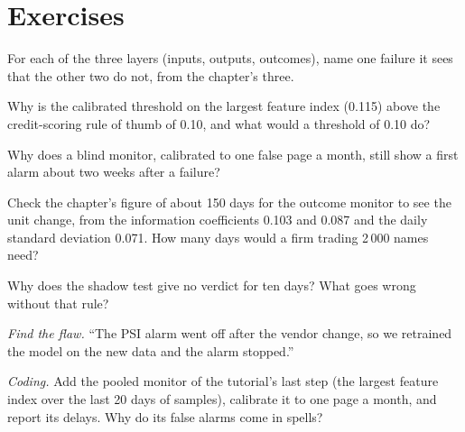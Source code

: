 \section{Exercises}

\begin{exercise}[$\star$]\label{exo:ml:monitoring-and-retraining:1}
For each of the three layers (inputs, outputs, outcomes), name one failure it sees that the other two do not, from the chapter's
three.
\end{exercise}

\begin{exercise}[$\star$]\label{exo:ml:monitoring-and-retraining:2}
Why is the calibrated threshold on the largest feature index (0.115) above the credit-scoring rule of thumb of 0.10, and what
would a threshold of 0.10 do?
\end{exercise}

\begin{exercise}[$\star$]\label{exo:ml:monitoring-and-retraining:3}
Why does a blind monitor, calibrated to one false page a month, still show a first alarm about two weeks after a failure?
\end{exercise}

\begin{exercise}[$\star\star$]\label{exo:ml:monitoring-and-retraining:4}
Check the chapter's figure of about 150 days for the outcome monitor to see the unit change, from the information coefficients
0.103 and 0.087 and the daily standard deviation 0.071. How many days would a firm trading 2\,000 names need?
\end{exercise}

\begin{exercise}[$\star\star$]\label{exo:ml:monitoring-and-retraining:5}
Why does the shadow test give no verdict for ten days? What goes wrong without that rule?
\end{exercise}

\begin{exercise}[$\star\star$]\label{exo:ml:monitoring-and-retraining:6}
\emph{Find the flaw.} ``The PSI alarm went off after the vendor change, so we retrained the model on the new data and the alarm
stopped.''
\end{exercise}

\begin{exercise}[$\star\star\star$]\label{exo:ml:monitoring-and-retraining:7}
\emph{Coding.} Add the pooled monitor of the tutorial's last step (the largest feature index over the last 20 days of samples),
calibrate it to one page a month, and report its delays. Why do its false alarms come in spells?
\end{exercise}

